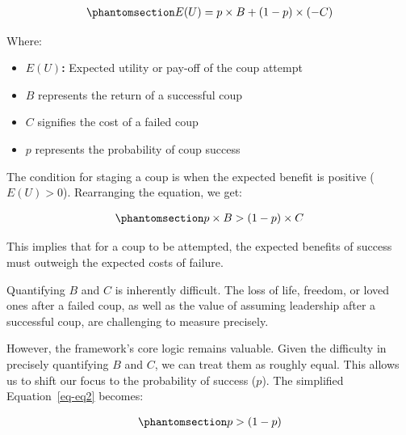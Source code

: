 \documentclass[
  12pt,
]{report}
\providecommand{\tightlist}{%
  \setlength{\itemsep}{0pt}\setlength{\parskip}{0pt}}\usepackage{longtable,booktabs,array}
\begin{document}
\begin{equation}\phantomsection\label{eq-eq1}{
\begin{aligned}
E(U) = p \times B + (1 - p) \times (-C)
\end{aligned}
}\end{equation}

Where:

\begin{itemize}
\tightlist
\item
  \(E(U)\)\textbf{:} Expected utility or pay-off of the coup attempt
\end{itemize}

\begin{itemize}
\item
  \(B\) represents the return of a successful coup
\item
  \(C\) signifies the cost of a failed coup
\item
  \(p\) represents the probability of coup success
\end{itemize}

The condition for staging a coup is when the expected benefit is
positive (\(E(U) > 0\)). Rearranging the equation, we get:

\begin{equation}\phantomsection\label{eq-eq2}{
\begin{aligned}
p \times B > (1 - p) \times C
\end{aligned}
}\end{equation}

This implies that for a coup to be attempted, the expected benefits of
success must outweigh the expected costs of failure.

Quantifying \(B\) and \(C\) is inherently difficult. The loss of life,
freedom, or loved ones after a failed coup, as well as the value of
assuming leadership after a successful coup, are challenging to measure
precisely.

However, the framework's core logic remains valuable. Given the
difficulty in precisely quantifying \(B\) and \(C\), we can treat them
as roughly equal. This allows us to shift our focus to the probability
of success (\(p\)). The simplified Equation~\ref{eq-eq2} becomes:

\begin{equation}\phantomsection\label{eq-eq3}{
\begin{aligned}
p > (1-p)
\end{aligned}
}\end{equation}
\end{document}
